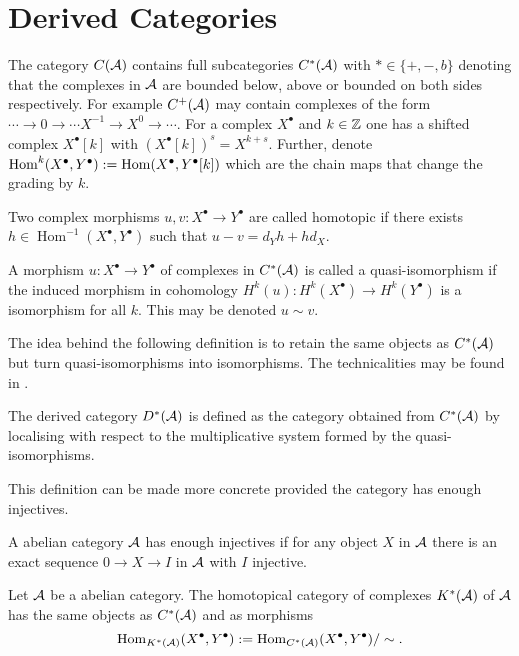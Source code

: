 \section{Derived Categories}
The category $C(\AA)$ contains full subcategories $C^*(\AA)$ with $*\in \{ +, -, b\}$ denoting that the complexes in $\AA$ are bounded below, above or bounded on both sides respectively.
For example $C^+(\AA)$ may contain complexes of the form $\cdots \to 0\to \cdots X^{-1} \to X^0 \to \cdots$.
For a complex $X^\bullet$ and $k\in \Z$ one has a shifted complex $X^\bullet[k]$ with $(X^\bullet[k])^s = X^{k+s}$.
Further, denote $\operatorname{Hom}^k(X^\bullet, Y^\bullet) :=  \op{Hom}(X^\bullet, Y^\bullet[k])$ which are the chain maps that change the grading by $k$.
\begin{definition}
 Two complex morphisms $u,v:X^\bullet\to Y^\bullet$ are called homotopic if there exists $h\in \operatorname{Hom}^{-1}(X^\bullet, Y^\bullet)$ such that $u-v = d_Y h + hd_X$.
\end{definition}
\begin{definition}
 A morphism $u:X^\bullet\to Y^\bullet$  of complexes in $C^*(\AA)$ is called a quasi-isomorphism if the induced morphism in cohomology $H^k(u):H^k(X^\bullet) \to H^k(Y^\bullet)$ is a isomorphism for all $k$. This may be denoted $u\sim v$.
\end{definition}
The idea behind the following definition is to retain the same objects as $C^*(\AA)$ but turn quasi-isomorphisms into isomorphisms.
The technicalities may be found in \cite[Chapter 8]{deligne1977sga}.
\begin{definition}
  The derived category $D^*(\AA)$ is defined as the category obtained from $C^*(\AA)$ by localising with respect to the multiplicative system formed by the quasi-isomorphisms.
\end{definition}
This definition can be made more concrete provided the category has enough injectives.
\begin{definition}
 A abelian category $\AA$ has enough injectives if for any object $X$ in $\AA$ there is an exact sequence $0\to X \to I$ in $\AA$ with $I$ injective.
\end{definition}
\begin{definition}
 Let $\AA$ be a abelian category.
 The homotopical category of complexes $K^*(\AA)$ of $\AA$ has the same objects as $C^*(\AA)$ and as morphisms
 $$\operatorname{Hom}_{K^*(\AA)}(X^\bullet,Y^\bullet):= \operatorname{Hom}_{C^*(\AA)}(X^\bullet,Y^\bullet)/\sim.$$
\end{definition}
